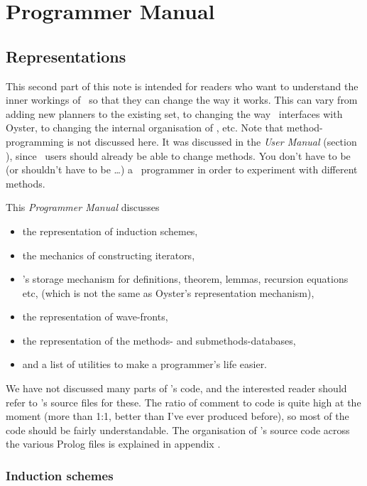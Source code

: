 \def\rcsid{$Id: ProgrammerManual.tex,v 1.16 2003/01/22 19:34:21 smaill Exp $}



\part{Programmer Manual}

\chapter {Representations}

This second part of this note is intended for readers who want to
understand the inner workings of \clam\ so that they can change the
way it works. This can vary from adding new planners to the existing
set, to changing the way \clam\ interfaces with Oyster, to changing the
internal organisation of \clam, etc. Note that method-programming is
not discussed here. It was discussed in the {\em User Manual\/} (section
), since \clam\ users should already be able to change
methods. You don't have to be (or shouldn't have to be \ldots) a
\clam\ programmer in order to experiment with different methods.

This {\em Programmer Manual\/} discusses
\begin{itemize}
\item
the representation of induction schemes,
\item
the mechanics of constructing iterators,
\item
{\clam}'s storage mechanism for definitions, theorem, lemmas,
recursion equations etc, (which is not the same as Oyster's
representation mechanism),
\item
the representation of wave-fronts,
\item
the representation of the methods- and submethods-databases,
\item
and a list of utilities to make a programmer's life easier. 
\end{itemize}

We have not discussed many parts of {\clam}'s code, and the interested
reader should refer to {\clam}'s source files for these. The ratio of
comment to code is quite high at the moment (more than 1:1, better than
I've ever produced before), so most of the code should be fairly
understandable. The organisation of {\clam}'s source code across the
various Prolog files is explained in appendix .

\section {Induction schemes}
\label{schemes}


